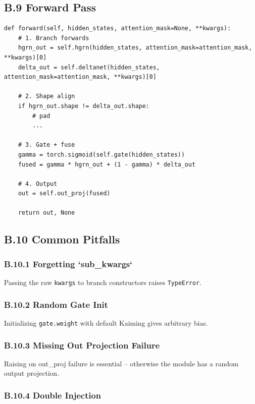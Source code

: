 \subsection{B.9 Forward Pass}

\begin{lstlisting}
def forward(self, hidden_states, attention_mask=None, **kwargs):
    # 1. Branch forwards
    hgrn_out = self.hgrn(hidden_states, attention_mask=attention_mask, **kwargs)[0]
    delta_out = self.deltanet(hidden_states, attention_mask=attention_mask, **kwargs)[0]
    
    # 2. Shape align
    if hgrn_out.shape != delta_out.shape:
        # pad
        ...
    
    # 3. Gate + fuse
    gamma = torch.sigmoid(self.gate(hidden_states))
    fused = gamma * hgrn_out + (1 - gamma) * delta_out
    
    # 4. Output
    out = self.out_proj(fused)
    
    return out, None
\end{lstlisting}

\subsection{B.10 Common Pitfalls}

\subsubsection{B.10.1 Forgetting `sub\_kwargs`}

Passing the raw \texttt{kwargs} to branch constructors raises \texttt{TypeError}.

\subsubsection{B.10.2 Random Gate Init}

Initializing \texttt{gate.weight} with default Kaiming gives arbitrary bias.

\subsubsection{B.10.3 Missing Out Projection Failure}

Raising on out\_proj failure is essential -- otherwise the module has a 
random output projection.

\subsubsection{B.10.4 Double Injection}

